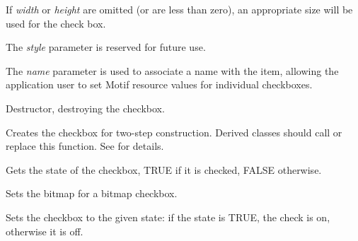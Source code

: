 If {\it width} or {\it height} are omitted (or are less than zero), an
appropriate size will be used for the check box.

The {\it style} parameter is reserved for future use.

The {\it name} parameter is used to associate a name with the item,
allowing the application user to set Motif resource values for
individual checkboxes.



Destructor, destroying the checkbox.




Creates the checkbox for two-step construction. Derived classes
should call or replace this function. See \rtfsp
for details.



Gets the state of the checkbox, TRUE if it is checked, FALSE otherwise.

\label{wxcheckboxsetlabel}


Sets the bitmap for a bitmap checkbox.



Sets the checkbox to the given state: if the state is TRUE, the check is on,
otherwise it is off.


